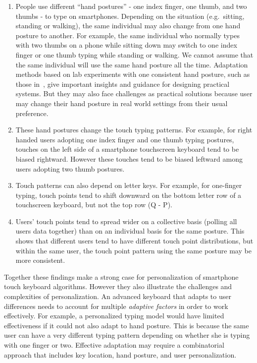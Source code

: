 \documentclass{sigchi}
\begin{document}
\begin{enumerate}
\item People use different ``hand postures'' - one index finger, one thumb, and
two thumbs - to type on smartphones. Depending on the situation (e.g.\ sitting,
standing or walking), the same individual may also change from one hand posture to another. For example, the same individual who normally types with two thumbs on a phone while sitting down may switch to one index finger or one thumb typing while standing or walking. We cannot assume that the same individual will use the same hand posture all the time. Adaptation methods based on lab experiments with one consistent hand  posture, such as those in~\cite{Findlater:2012}, give important insights and guidance for designing practical systems. But they may also face challenges as practical solutions because user may change their hand posture in real world settings from their usual preference.

\item These hand postures change the touch typing patterns. For example, for right handed users adopting one index finger and one thumb typing postures, touches on the left side of a smartphone touchscreen keyboard tend to be biased rightward. However these touches tend to be biased leftward among users adopting two thumb postures.

\item Touch patterns can also depend on letter keys. For example, for one-finger typing, touch points tend to shift downward on the bottom letter row of a touchscreen keyboard, but not the top row (Q - P). 

\item Users’ touch points tend to spread wider on a collective basis (polling all users data together) than on an individual basis for the same posture. This shows that different users tend to have different touch point distributions, but within the same user, the touch point pattern using the same posture may be more consistent.
\end{enumerate}

Together these findings make a strong case for personalization of smartphone
touch keyboard algorithms. However they also illustrate the challenges and
complexities of personalization. An advanced keyboard that adapts to user
differences needs to account for multiple \textit{adaptive factors} in order to
work effectively. For example, a personalized typing model would have limited
effectiveness if it could not also adapt to hand posture. This is because the
same user can have a very different typing pattern depending on whether she is
typing with one finger or two. Effective adaptation may require a combinatorial
approach that includes key location, hand posture, and user personalization.
\end{document}
